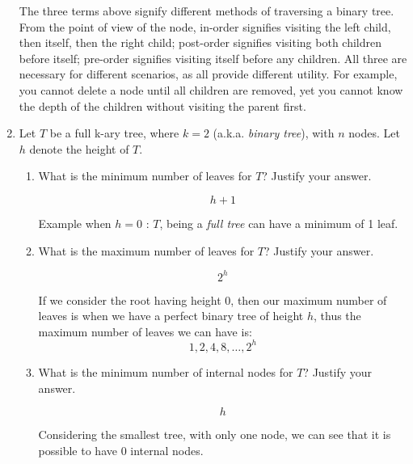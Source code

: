 \documentclass[11pt]{article}
\begin{document}
\begin{enumerate}
    The three terms above signify different methods of traversing a binary tree. From the point of view of the node, in-order signifies visiting the left child, then itself, then the right child; post-order signifies visiting both children before itself; pre-order signifies visiting itself before any children. All three are necessary for different scenarios, as all provide different utility. For example, you cannot delete a node until all children are removed, yet you cannot know the depth of the children without visiting the parent first.

    \item Let $T$ be a full k-ary tree, where $k=2$ (a.k.a. {\it binary tree}), with $n$ nodes.  Let $h$ denote the height of $T$.
    \begin{enumerate}
        \item What is the minimum number of leaves for $T$?  Justify your answer.

        $$ h + 1 $$
        
        \vspace{0.5cm}
        Example when $h = 0$ : $T$, being a \emph{full tree} can have a minimum of 1 leaf.

        \begin{center}
        \end{center}
        \newpage

        \item What is the maximum number of leaves for $T$?  Justify your answer.

        $$ 2^h $$
        
        \vspace{0.5cm}
        If we consider the root having height 0, then our maximum number of leaves is when we have a perfect binary tree of height $h$, thus the maximum number of leaves we can have is:
        $$ 1, 2, 4, 8, \ldots, 2^h $$
        \vspace{.5cm}
        
        \item What is the minimum number of internal nodes for $T$?  Justify your answer.

        $$ h $$

        \vspace{0.5cm}
        Considering the smallest tree, with only one node, we can see that it is possible to have 0 internal nodes. 


\end{enumerate}
\end{enumerate}
\end{document}
